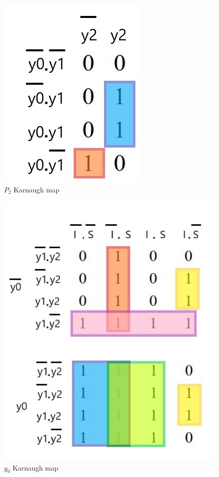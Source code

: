 \documentclass[../../e3_tp3_main.tex]{subfiles}
\begin{document}
\begin{figure}[H]
	\centering
	\includegraphics[scale=0.8]{figures/e3_tp3_ej1_moore_b2_kmap.jpg}
	\caption{$P_2$ Karnaugh map}
\end{figure}

\begin{figure}[H]
	\centering
	\includegraphics[scale=1]{figures/e3_tp3_ej1_moore_y0_kmap.jpg}
	\caption{$y_0$ Karnaugh map}
\end{figure}
\end{document}
